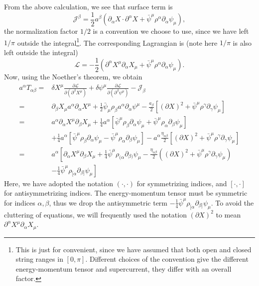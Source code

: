 \documentclass[graybox,envcountchap,sectrefs]{svmono}
\begin{document}
From the above calculation, we see that surface term is
\begin{equation}
	\mathcal{J}^{\beta}=\frac{1}{2}a^{\beta}\left(\partial_{\alpha} X\cdot \partial^{\alpha} X+\bar{\psi}^{\mu} \rho^{\alpha} \partial_{\alpha} \psi_{\mu}\right),
\end{equation}
the normalization factor $1/2$ is a convention we choose to use, since we have left $1/\pi$ outside the integral\footnote{This is just for convenient, since we have assumed that both open and closed string ranges in $[0,\pi]$. Different choices of the convention give the different energy-momentum tensor and supercurrent, they differ with an overall factor.}.
The corresponding Lagrangian is (note here $1/\pi$ is also left outside the integral)
\begin{equation}
\mathcal{L}=-\frac{1}{2}	\left(\partial^{\alpha}X^{\mu}\partial_{\alpha}X_{\mu}+\bar{\psi}^{\mu}\rho^{\alpha}\partial_{\alpha}\psi_{\mu}	\right).
\end{equation}
Now, using the Noether's theorem, we obtain
\begin{equation}
\begin{aligned}
a^{\alpha} T_{\alpha \beta}=& \delta X^{\mu} \frac{\partial \mathcal{L}}{\partial\left(\partial^{\beta} X^{\mu}\right)}+\delta \psi^{\mu} \frac{\partial \mathcal{L}}{\partial\left(\partial^{\beta} \psi^{\mu}\right)}-\mathcal{J}_{\beta} \\
=& \partial_{\beta} X_{\mu} a^{\alpha} \partial_{\alpha} X^{\mu}+\frac{1}{2} \bar{\psi}_{\mu} \rho_{\beta} a^{\alpha} \partial_{\alpha} \psi^{\mu}-\frac{a_{\beta}}{2}\left[(\partial X)^{2}+\bar{\psi}^{\mu} \rho^{\gamma} \partial_{\gamma} \psi_{\mu}\right] \\
=& a^{\alpha} \partial_{\alpha} X^{\mu} \partial_{\beta} X_{\mu}+\frac{1}{4} a^{\alpha}\left[\bar{\psi}^{\mu} \rho_{\beta} \partial_{\alpha} \psi_{\mu}+\bar{\psi}^{\mu} \rho_{\alpha} \partial_{\beta} \psi_{\mu}\right] \\
&+\frac{1}{4} a^{\alpha}\left[\bar{\psi}^{\mu} \rho_{\beta} \partial_{\alpha} \psi_{\mu}-\bar{\psi}^{\mu} \rho_{\alpha} \partial_{\beta} \psi_{\mu}\right]-a^{\alpha} \frac{\eta_{\alpha \beta}}{2}\left[(\partial X)^{2}+\bar{\psi}^{\mu} \rho^{\gamma} \partial_{\gamma} \psi_{\mu}\right]\\
=&a^{\alpha}\left[
\partial_{\alpha} X^{\mu} \partial_{\beta} X_{\mu}
+\frac{1}{4} \bar{\psi}^{\mu} \rho_{(\alpha} \partial_{\beta)} \psi_{\mu}
-\frac{\eta_{\alpha \beta}}{2}\left((\partial X)^{2}+\bar{\psi}^{\mu} \rho^{\gamma} \partial_{\gamma} \psi_{\mu}\right)\right.
\\
&\left. -\frac{1}{4} \bar{\psi}^{\mu} \rho_{[\alpha} \partial_{\beta]} \psi_{\mu}\right]
\end{aligned}
\end{equation}
Here, we have adopted the notation $(\cdot,\cdot)$ for symmetrizing indices, and $[\cdot,\cdot]$ for antisymmetrizing indices.
The energy-momentum tensor must be symmetric for indices $\alpha, \beta$, thus we drop the antisymmetric term $ -\frac{1}{4} \bar{\psi}^{\mu} \rho_{[ \alpha} \partial_{\beta ]} \psi_{\mu}$. 
To avoid the cluttering of equations, we will frequently used the notation $(\partial X)^2$ to mean $\partial^{\alpha}X^{\mu}\partial_{\alpha}X_{\mu}$.
\end{document}
